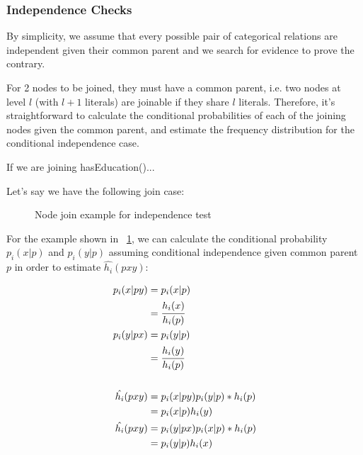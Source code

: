 \subsubsection{Independence Checks}

By simplicity, we assume that every possible pair of categorical relations are independent given their common parent and
we search for evidence to prove the contrary.

For 2 nodes to be joined, they must have a common parent, i.e. two nodes at level $l$ (with $l+1$ literals) are joinable
if they share $l$ literals. Therefore, it's straightforward to calculate the conditional probabilities of each of the
joining nodes given the common parent, and estimate the frequency distribution for the conditional independence case.

If we are joining hasEducation()...

Let's say we have the following join case:
 
\begin{figure}[!h]
  \caption{Node join example for independence test}
  \centering
  \label{fig:joinIndepExample}
\end{figure}

For the example shown in ~\ref{fig:joinIndepExample}, we can calculate the conditional probability $p_i(x|p)$ and
$p_i(y|p)$ assuming conditional independence given common parent $p$ in order to estimate $\hat{h_i}(p x y)$:

\begin{equation}
\label{eq:condindep}
\begin{split}
 p_i(x|py) &= p_i(x|p) \\ 
 &= \cfrac{h_i(x)}{h_i(p)} \\ 
 p_i(y|px) &= p_i(y|p) \\ 
 &= \cfrac{h_i(y)}{h_i(p)} \\ \\ 
 \hat{h_i}(pxy) &= p_i(x|py)p_i(y|p)*h_i(p) \\ 
 &= p_i(x|p)h_i(y) \\ 
 \hat{h_i}(pxy) &= p_i(y|px)p_i(x|p)*h_i(p) \\ 
 &= p_i(y|p)h_i(x) 
\end{split}
\end{equation}

